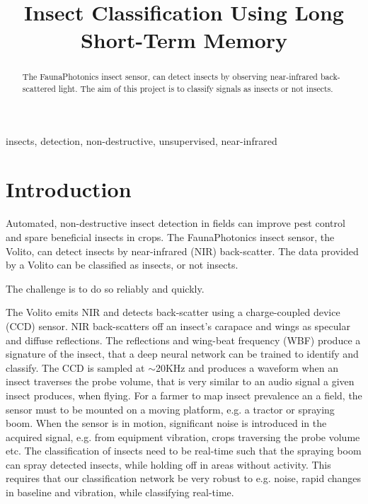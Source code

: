 \documentclass{article}
\title{Insect Classification Using Long Short-Term Memory}
\begin{document}
%

\maketitle
%
\begin{abstract}
The FaunaPhotonics insect sensor, can detect insects by observing near-infrared back-scattered light. 
The aim of this project is to classify signals as insects or not insects.
\end{abstract}
%
\begin{keywords}
insects, detection, non-destructive, unsupervised, near-infrared
\end{keywords}
%
\section{Introduction}
\label{sec:intro}

Automated, non-destructive insect detection in fields can improve pest control and spare beneficial insects in crops\cite{Kirkeby2021}. The FaunaPhotonics insect sensor\cite{rydhmer2021automating}, the Volito, can detect insects by near-infrared (NIR) back-scatter. 
The data provided by a Volito can be classified as insects, or not insects. 

The challenge is to do so reliably and quickly.

The Volito emits NIR and detects back-scatter using a charge-coupled device (CCD) sensor. NIR back-scatters off an insect's carapace and wings as specular and diffuse reflections.
The reflections and wing-beat frequency (WBF) produce a signature of the insect, that a deep neural network can be trained to identify and classify.
The CCD is sampled at $\sim$20KHz and produces a waveform when an insect traverses the probe volume, that is very similar to an audio signal a given insect produces, when flying. 
For a farmer to map insect prevalence an a field, the sensor must to be mounted on a moving platform, e.g. a tractor or spraying boom. When the sensor is in motion, significant noise is introduced in the acquired signal, e.g. from equipment vibration, crops traversing the probe volume etc.
The classification of insects need to be real-time such that the spraying boom can spray detected insects, while holding off in areas without activity.
This requires that our classification network be very robust to e.g. noise, rapid changes in baseline and vibration, while classifying real-time.









\end{document}
